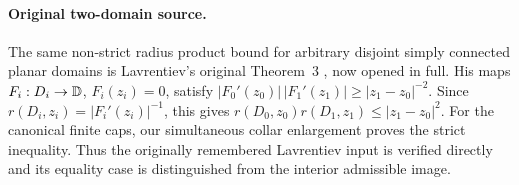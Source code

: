 \paragraph{Original two-domain source.}
The same non-strict radius product bound for arbitrary disjoint simply
connected planar domains is Lavrentiev's original Theorem~3
\citep[\S2, pp.~169--173]{Lavrentiev1934}, now opened in full.
His maps $F_i:D_i\to{\mathbb{D}}$, $F_i(z_i)=0$, satisfy
$|F_0'(z_0)|\,|F_1'(z_1)|\ge |z_1-z_0|^{-2}$.
Since $r(D_i,z_i)=|F_i'(z_i)|^{-1}$, this gives
$r(D_0,z_0)r(D_1,z_1)\le|z_1-z_0|^2$.
For the canonical finite caps, our simultaneous collar enlargement
proves the strict inequality. Thus the originally remembered
Lavrentiev input is verified directly and its equality case is
distinguished from the interior admissible image.
